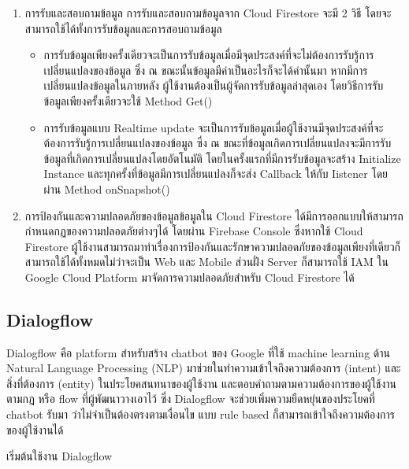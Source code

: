 \begin{enumerate}
\begin{itemize}
	\end{itemize}
	\item การรับและสอบถามข้อมูล
	การรับและสอบถามข้อมูลจาก Cloud Firestore จะมี 2 วิธี โดยจะสามารถใช้ได้ทั้งการรับข้อมูลและการสอบถามข้อมูล
	\begin{itemize}
		\item การรับข้อมูลเพียงครั้งเดียวจะเป็นการรับข้อมูลเมื่อมีจุดประสงค์ที่จะไม่ต้องการรับรู้การเปลี่ยนแปลงของข้อมูล ซึ่ง ณ ขณะนั้นข้อมูลมีค่าเป็นอะไรก็จะได้ค่านั้นมา หากมีการเปลี่ยนแปลงข้อมูลในภายหลัง ผู้ใช้งานต้องเป็นผู้จัดการรับข้อมูลล่าสุดเอง โดยวิธีการรับข้อมูลเพียงครั้งเดียวจะใช้ Method Get()
		\item การรับข้อมูลแบบ Realtime update จะเป็นการรับข้อมูลเมื่อผู้ใช้งานมีจุดประสงค์ที่จะต้องการรับรู้การเปลี่ยนแปลงของข้อมูล ซึ่ง ณ ขณะที่ข้อมูลเกิดการเปลี่ยนแปลงจะมีการรับข้อมูลที่เกิดการเปลี่ยนแปลงโดยอัตโนมัติ โดยในครั้งแรกที่มีการรับข้อมูลจะสร้าง Initialize Instance และทุกครั้งที่ข้อมูลมีการเปลี่ยนแปลงก็จะส่ง Callback ให้กับ Iistener โดยผ่าน Method onSnapshot()
	\end{itemize}
	\item การป้องกันและความปลอดภัยของข้อมูลข้อมูลใน Cloud Firestore ได้มีการออกแบบให้สามารถกำหนดกฏของความปลอดภัยต่างๆได้ โดยผ่าน Firebase Console  ซึ่งหากใช้ Cloud Firestore ผู้ใช้งานสามารถมาทำเรื่องการป้องกันและรักษาความปลอดภัยของข้อมูลเพียงที่เดียวก็สามารถใช้ได้ทั้งหมดไม่ว่าจะเป็น Web และ Mobile ส่วนฝั่ง Server ก็สามารถใช้ IAM ใน Google Cloud Platform มาจัดการความปลอดภัยสำหรับ Cloud Firestore ได้
\end{enumerate}


\subsection{Dialogflow}
Dialogflow คือ platform สำหรับสร้าง chatbot ของ Google ที่ใช้ machine learning ด้าน Natural Language Processing (NLP) มาช่วยในทำความเข้าใจถึงความต้องการ (intent) และสิ่งที่ต้องการ (entity) ในประโยคสนทนาของผู้ใช้งาน และตอบคำถามตามความต้องการของผู้ใช้งาน ตามกฎ หรือ flow ที่ผู้พัฒนาวางเอาไว้ ซึ่ง Dialogflow จะช่วยเพิ่มความยืดหยุ่นของประโยคที่ chatbot รับมา ว่าไม่จำเป็นต้องตรงตามเงื่อนไข แบบ rule based ก็สามารถเข้าใจถึงความต้องการของผู้ใช้งานได้

 เริ่มต้นใช้งาน Dialogflow

